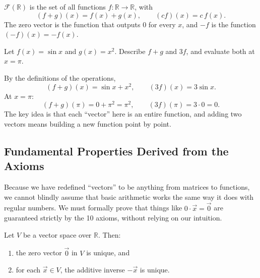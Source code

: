 \begin{definition}
$\mathcal{F}(\mathbb{R})$ is the set of all functions $f : \mathbb{R} \to \mathbb{R}$, with
\[
(f + g)(x) = f(x) + g(x), \qquad (cf)(x) = c\,f(x).
\]
The zero vector is the function that outputs $0$ for every $x$, and $-f$ is the function $(-f)(x) = -f(x)$.
\end{definition}

\begin{example}
Let $f(x) = \sin x$ and $g(x) = x^2$. Describe $f + g$ and $3f$, and evaluate both at $x = \pi$.

\begin{solution}
By the definitions of the operations,
\[
(f + g)(x) = \sin x + x^2, \qquad (3f)(x) = 3\sin x.
\]
At $x = \pi$:
\[
(f + g)(\pi) = 0 + \pi^2 = \pi^2, \qquad (3f)(\pi) = 3 \cdot 0 = 0.
\]
The key idea is that each ``vector'' here is an entire function, and adding two vectors means building a new function point by point.
\end{solution}
\end{example}

\subsection{Fundamental Properties Derived from the Axioms}\label{sec:L1-props}

\begin{intuition}
Because we have redefined ``vectors'' to be anything from matrices to functions, we cannot blindly assume that basic arithmetic works the same way it does with regular numbers. We must formally prove that things like $0 \cdot \vec{x} = \vec{0}$ are guaranteed strictly by the 10 axioms, without relying on our intuition.
\end{intuition}

\begin{theorem}\label{thm:L1-unique}
Let $V$ be a vector space over $\mathbb{R}$. Then:
\begin{enumerate}
    \item the zero vector $\vec{0}$ in $V$ is unique, and
    \item for each $\vec{x} \in V$, the additive inverse $-\vec{x}$ is unique.
\end{enumerate}
\end{theorem}

